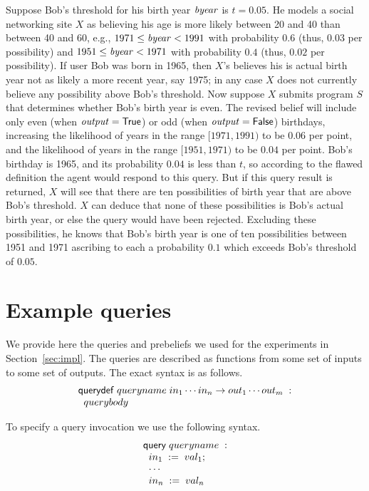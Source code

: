 Suppose Bob's threshold for his birth year $\mathit{byear}$ is $t =
0.05$.  He models a social networking site $X$ as believing his age is
more likely between 20 and 40 than between 40 and 60, e.g., $1971 \leq
\mathit{byear} < 1991$ with probability $0.6$ (thus, $0.03$ per
possibility) and $1951 \leq \mathit{byear} < 1971$ with probability $0.4$
(thus, $0.02$ per possibility).  If user Bob was born in 1965, then
$X$'s believes his is actual birth year not as likely a more recent
year, say 1975; in any case $X$ does not currently believe any
possibility above Bob's threshold.  Now suppose $X$ submits program
$S$ that determines whether Bob's birth year is even.  The revised
belief will include only even (when $\mathit{output} = \mathsf{True}$) or odd
(when $\mathit{output} = \mathsf{False}$) birthdays, increasing the likelihood
of years in the range $[1971,1991)$ to be $0.06$ per point, and the
likelihood of years in the range $[1951,1971)$ to be $0.04$ per point.
Bob's birthday is 1965, and its probability $0.04$ is less than $t$,
so according to the flawed definition the agent would respond to this
query.  But if this query result is returned, $X$ will see that there
are ten possibilities of birth year that are above Bob's threshold.
$X$ can deduce that none of these possibilities is Bob's actual birth
year, or else the query would have been rejected.  Excluding these
possibilities, he knows that Bob's birth year is one of ten
possibilities between 1951 and 1971 ascribing to each a probability
$0.1$ which exceeds Bob's threshold of $0.05$.

\vspace*{.1in}
\section{Example queries} \label{appendix:queries}

%

We provide here the queries and prebeliefs we used for the experiments
in Section~\ref{sec:impl}. The queries are described as functions
from some set of inputs to some set of outputs. The exact syntax is as
follows.
$$
\begin{array}{l}
\mathsf{querydef} \; queryname \; in_1 \cdots in_n \rightarrow out_1 \cdots out_m \; : \\
\;\; querybody \\
\end{array}
$$

To specify a query invocation we use the following syntax.
$$
\begin{array}{l}
\mathsf{query} \; queryname \; : \\
\;\; in_1 \; := \; val_1; \\
\;\; \cdots \\
\;\; in_n \; := \; val_n
\end{array}
$$

